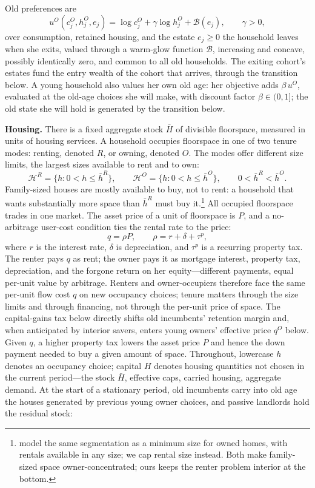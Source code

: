 \documentclass[11pt]{article}
\newcommand{\1}{\mathbf 1}
\newcommand{\HH}{\mathcal H}
\begin{document}
Old preferences are
\[
u^O(c_j^O,h_j^O,e_j)
=
\log c_j^O+\gamma\log h_j^O+\mathcal B(e_j),
\qquad
\gamma>0,
\]
over consumption, retained housing, and the estate $e_j\ge0$ the household leaves when she exits, valued through a warm-glow function $\mathcal B$, increasing and concave, possibly identically zero, and common to all old households. The exiting cohort's estates fund the entry wealth of the cohort that arrives, through the transition below. A young household also values her own old age: her objective adds $\beta\,u^O$, evaluated at the old-age choices she will make, with discount factor $\beta\in(0,1]$; the old state she will hold is generated by the transition below.

\textbf{Housing.} There is a fixed aggregate stock $\bar H$ of divisible floorspace, measured in units of housing services. A household occupies floorspace in one of two tenure modes: renting, denoted $R$, or owning, denoted $O$. The modes offer different size limits, the largest sizes available to rent and to own:
\[
\HH^R=\{h:0<h\le \bar h^R\},
\qquad
\HH^O=\{h:0<h\le \bar h^O\},
\qquad
0<\bar h^R<\bar h^O.
\]
Family-sized houses are mostly available to buy, not to rent: a household that wants substantially more space than $\bar h^R$ must buy it.\footnote{\citet{coven2024} model the same segmentation as a minimum size for owned homes, with rentals available in any size; we cap rental size instead. Both make family-sized space owner-concentrated; ours keeps the renter problem interior at the bottom.} All occupied floorspace trades in one market. The asset price of a unit of floorspace is $P$, and a no-arbitrage user-cost condition ties the rental rate to the price:
\begin{equation}
q=\rho P,
\qquad
\rho=r+\delta+\tau^p,
\label{eq:compact_owner_price}
\end{equation}
where $r$ is the interest rate, $\delta$ is depreciation, and $\tau^p$ is a recurring property tax. The renter pays $q$ as rent; the owner pays it as mortgage interest, property tax, depreciation, and the forgone return on her equity---different payments, equal per-unit value by arbitrage. Renters and owner-occupiers therefore face the same per-unit flow cost $q$ on new occupancy choices; tenure matters through the size limits and through financing, not through the per-unit price of space. The capital-gains tax below directly shifts old incumbents' retention margin and, when anticipated by interior savers, enters young owners' effective price $q^O$ below. Given $q$, a higher property tax lowers the asset price $P$ and hence the down payment needed to buy a given amount of space. Throughout, lowercase $h$ denotes an occupancy choice; capital $H$ denotes housing quantities not chosen in the current period---the stock $\bar H$, effective caps, carried housing, aggregate demand. At the start of a stationary period, old incumbents carry into old age the houses generated by previous young owner choices, and passive landlords hold the residual stock:
\end{document}
